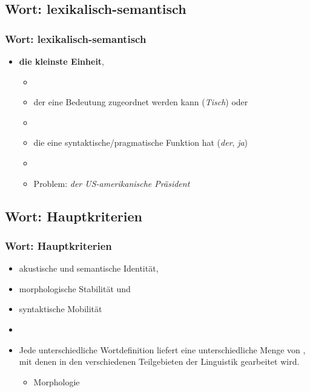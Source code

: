 \subsection{Wort: lexikalisch-semantisch}


\begin{frame}
\frametitle{Wort: lexikalisch-semantisch}

\begin{itemize}
	\item \textbf{die kleinste Einheit},
	
	\begin{itemize}
		\item[]
		\item der eine Bedeutung zugeordnet werden kann (\emph{Tisch}) oder
		\item[]		
		\item die eine syntaktische/pragmatische Funktion hat (\emph{der}, \emph{ja})
		\item[]
		\item Problem: \emph{der US-amerikanische Präsident}
	\end{itemize}
\end{itemize}


\end{frame}


\subsection{Wort: Hauptkriterien}


\begin{frame}
\frametitle{Wort: Hauptkriterien}

\begin{itemize}
	\item akustische und semantische Identität,
	\item morphologische Stabilität und
	\item syntaktische Mobilität
	\item[]
	\item Jede unterschiedliche Wortdefinition liefert eine unterschiedliche Menge von , mit denen in den verschiedenen Teilgebieten der Linguistik gearbeitet wird.
	
	\begin{itemize}
		\item Morphologie \ras {}
	\end{itemize}
\end{itemize}


\end{frame}


